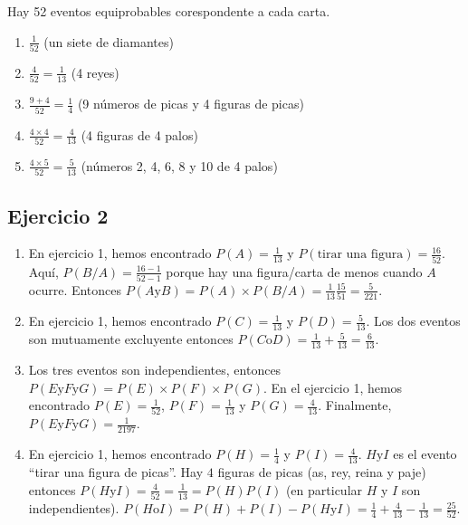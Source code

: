 Hay 52 eventos equiprobables corespondente a cada carta.

\begin{enumerate}
\item $\frac{1}{52}$ (un siete de diamantes)
\item $\frac{4}{52} = \frac{1}{13}$ (4 reyes)
\item $\frac{9 + 4}{52} = \frac{1}{4}$ (9 números de picas y 4 figuras de picas)
\item $\frac{4 \times 4}{52} = \frac{4}{13}$ (4 figuras de 4 palos)
\item $\frac{4 \times 5}{52} = \frac{5}{13}$ (números 2, 4, 6, 8 y 10 de 4 palos)
\end{enumerate}

\subsection{Ejercicio 2}

\begin{enumerate}

\item En ejercicio 1, hemos encontrado $P(A) = \frac{1}{13}$
  y $P(\text{tirar una figura}) = \frac{16}{52}$. Aquí,
  $P(B / A) = \frac{16 - 1}{52 - 1}$ porque hay una figura/carta de menos
  cuando $A$ ocurre. Entonces
  $P(A \text{y} B) = P(A) \times P(B / A) = 
  \frac{1}{13} \frac{15}{51} = \frac{5}{221}$.

\item En ejercicio 1, hemos encontrado $P(C) = \frac{1}{13}$ y
  $P(D) = \frac{5}{13}$. Los dos eventos son mutuamente excluyente entonces
  $P(C \text{o} D) = \frac{1}{13} + \frac{5}{13} = \frac{6}{13}$.

\item Los tres eventos son independientes, entonces
  $P(E \text{y} F \text{y} G) = {P(E)} \times {P(F)} \times {P(G)}$.
  En el ejercicio 1, hemos encontrado
  $P(E) = \frac{1}{52}$, $P(F) = \frac{1}{13}$ y $P(G) = \frac{4}{13}$.
  Finalmente, $P(E \text{y} F \text{y} G) = \frac{1}{2197}$.

\item En ejercicio 1, hemos encontrado
  $P(H) = \frac{1}{4}$ y $P(I) = \frac{4}{13}$.
  $H \text{y} I$ es el evento ``tirar una figura de picas''. Hay $4$ figuras
  de picas (as, rey, reina y paje) entonces
  $P(H \text{y} I) = \frac{4}{52}=\frac{1}{13} = P(H) P(I)$ (en particular
  $H$ y $I$ son independientes).
  $P(H \text{o} I) = P(H) + P(I) - P(H \text{y} I) =
  \frac{1}{4} + \frac{4}{13} - \frac{1}{13} = \frac{25}{52}$.
\end{enumerate}

